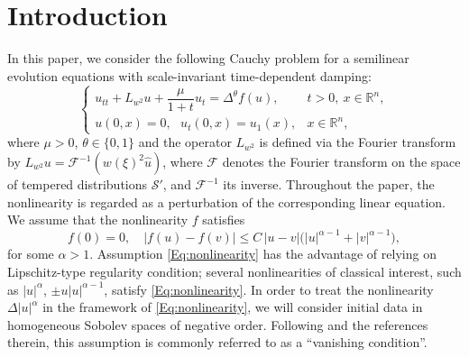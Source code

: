 \documentclass[10pt]{article}
\newcommand{\<}{\langle}
\renewcommand{\>}{\rangle}
\numberwithin{equation}{section}
\begin{document}
\section{Introduction} \label{Sec:Introduction}
In this paper, we consider the following Cauchy problem for a semilinear evolution equations with scale-invariant time-dependent damping:
\begin{equation}\label{Eq:SemilinearProblem}
\begin{cases}
u_{tt} + L_{w^2}u + \dfrac{\mu}{1+t}u_t =\Delta^{\theta} f(u), & t>0,\ x\in\mathbb{R}^n,\\
u(0,x) = 0, \,\,\,\, u_t(0,x) = u_1(x), & x\in\mathbb{R}^n,
\end{cases}
\end{equation}
where $\mu> 0$,   $\theta\in \{0, 1\}$ and  the
 operator $L_{w^2}$ is defined via the Fourier transform by $ L_{w^2}u = \mathcal{F}^{-1}( w(\xi)^2\hat{u})$, where $\mathcal{F}$ denotes the Fourier transform on the space of tempered distributions $\mathcal{S}'$, and $\mathcal{F}^{-1}$ its inverse.
 Throughout the paper, the nonlinearity is regarded as a perturbation of the corresponding linear equation.
We assume that the nonlinearity $f$ satisfies
\begin{equation} \label{Eq:nonlinearity}
f(0)=0, \quad |f(u)-f(v)|\leq C\,|u-v|\big(|u|^{\alpha-1}+|v|^{\alpha-1}\big),
\end{equation}
for some $\alpha>1$. Assumption \eqref{Eq:nonlinearity} has the advantage of relying on Lipschitz-type regularity condition; several nonlinearities of classical interest, such as $|u|^\alpha$, $\pm u|u|^{\alpha-1}$, satisfy \eqref{Eq:nonlinearity}.
In order to treat the nonlinearity $\Delta|u|^\alpha$ in the framework of \eqref{Eq:nonlinearity}, we will consider initial data in homogeneous Sobolev spaces of negative order. Following \cite{Cho-Ozawa=2007} and the references therein, this assumption is commonly referred to as a ``vanishing condition''.

\end{document}
